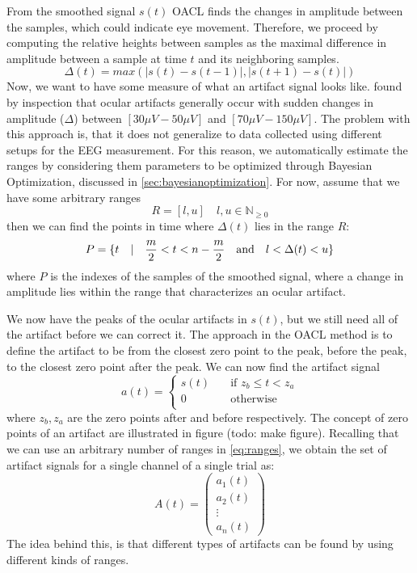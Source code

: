 From the smoothed signal $s(t)$ OACL finds the changes in amplitude between the samples, which could indicate eye movement. Therefore, we proceed by computing the relative heights between samples as the maximal difference in amplitude between a sample at time $t$ and its neighboring samples.
\begin{equation}
\label{eq:relheights}
\Delta (t) = max(|s(t)-s(t-1)|,|s(t+1) - s(t)|)
\end{equation}
Now, we want to have some measure of what an artifact signal looks like. \citet{li2015ocular} found by inspection that ocular artifacts generally occur with sudden changes in amplitude ($\Delta$) between $[30\mu V-50\mu V]$ and $[70\mu V-150\mu V]$. The problem with this approach is, that it does not generalize to data collected using different setups for the EEG measurement. For this reason, we automatically estimate the ranges by considering them parameters to be optimized through Bayesian Optimization, discussed in \cref{sec:bayesianoptimization}.
For now, assume that we have some arbitrary ranges
\begin{equation}
\label{eq:ranges}
R=[l, u] \quad  l,u \in \mathbb{N}_{\geq 0}
\end{equation}
then we can find the points in time where $\Delta (t)$  lies in the range $R$:
\begin{equation}
\label{eq:peaks}
P = \{t \quad | \quad \frac{m}{2} < t < n-\frac{m}{2} \quad \textnormal{and} \quad l < \Delta (t) < u\}
\end{equation}
where $P$ is the indexes of the samples of the smoothed signal, where a change in amplitude lies within the range that characterizes an ocular artifact.

We now have the peaks of the ocular artifacts in $s(t)$, but we still need all of the artifact before we can correct it. The approach in the OACL method is to define the artifact to be from the closest zero point to the peak, before the peak, to the closest zero point after the peak. We can now find the artifact signal 
\begin{equation}
\label{eq:artifactsignal}
a(t) =
\begin{cases}
s(t)      & \quad \text{if } z_b \leq t < z_a\\
0  & \quad \text{otherwise}\\
\end{cases}
\end{equation}
where $z_b, z_a$ are the zero points after and before respectively. The concept of zero points of an artifact are illustrated in figure (todo: make figure).
Recalling that we can use an arbitrary number of ranges in \cref{eq:ranges}, we obtain the set of artifact signals for a single channel of a single trial as:
\begin{equation}
A(t)=  \begin{pmatrix}
a_1(t) \\
a_2(t) \\
\vdots  \\
a_n(t) 
\end{pmatrix}
\end{equation}
The idea behind this, is that different types of artifacts can be found by using different kinds of ranges. 
